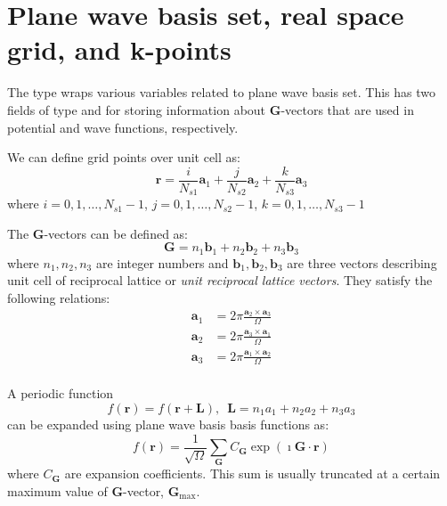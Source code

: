 \section{Plane wave basis set, real space grid, and k-points}

The type  wraps various variables related to plane wave basis
set. This has two fields of type 
and  for storing information about $\mathbf{G}$-vectors
that are used in potential and wave functions, respectively.



We can define grid points over unit cell as:
$$
\mathbf{r} = \frac{i}{N_{s1}}\mathbf{a}_{1} + \frac{j}{N_{s2}}\mathbf{a}_{2} +
\frac{k}{N_{s3}}\mathbf{a}_{3}
$$
where $i = 0,1,\ldots,N_{s1}-1$, $j = 0,1,\ldots,N_{s2}-1$, $k = 0,1,\ldots,N_{s3}-1$





The $\mathbf{G}$-vectors can be defined as:
\begin{equation}
\mathbf{G} = n_1 \mathbf{b}_1 + n_2 \mathbf{b}_2 + n_3 \mathbf{b}_3
\end{equation}
where $n_1, n_2, n_3$ are integer numbers and
$\mathbf{b}_1, \mathbf{b}_2, \mathbf{b}_3$ are three vectors describing
unit cell of reciprocal lattice or \textit{unit reciprocal lattice vectors}.
They satisfy the following relations:
\begin{align*}
\mathbf{a}_1 & = 2\pi\frac{\mathbf{a}_{2} \times \mathbf{a}_{3}}{\Omega} \\
\mathbf{a}_2 & = 2\pi\frac{\mathbf{a}_{3} \times \mathbf{a}_{1}}{\Omega} \\
\mathbf{a}_3 & = 2\pi\frac{\mathbf{a}_{1} \times \mathbf{a}_{2}}{\Omega} \\
\end{align*}

A periodic function
\begin{equation}
f(\mathbf{r}) = f(\mathbf{r}+\mathbf{L}),\,\,\,
\mathbf{L} = n_{1}a_{1} + n_{2}a_{2} + n_{3}a_{3}
\end{equation}
can be expanded using plane wave basis basis functions as:
\begin{equation}
f(\mathbf{r}) = \frac{1}{\sqrt{\Omega}}\sum_{\mathbf{G}}
C_{\mathbf{G}} \exp(\imath \mathbf{G} \cdot \mathbf{r})
\end{equation}
where $C_{\mathbf{G}}$ are expansion coefficients. This sum is usually truncated
at a certain maximum value of $\mathbf{G}$-vector, $\mathbf{G}_{\mathrm{max}}$.


